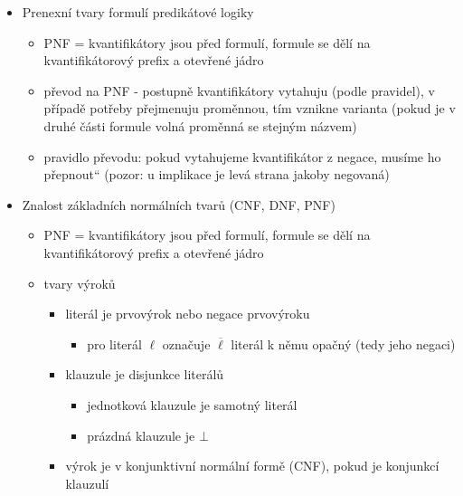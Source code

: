 \begin{itemize}
\begin{itemize}
\begin{itemize}
\item term $t$ je substituovatelný za proměnnou $x$ ve formuli $\varphi$, pokud po simultánním nahrazení všech volných výskytů $x$ ve $\varphi$ za $t$ nevznikne ve $\varphi$ žádný vázaný výskyt proměnné z $t$
\begin{itemize}
\item v tom případě říkáme vzniklé formuli instance $\varphi$ vzniklá substitucí $t$ za $x$ a označujeme ji $\varphi(x/t)$
\end{itemize}
\end{itemize}
\end{itemize}
\item Prenexní tvary formulí predikátové logiky
\begin{itemize}
\item PNF = kvantifikátory jsou před formulí, formule se dělí na kvantifikátorový prefix a otevřené jádro
\item převod na PNF - postupně kvantifikátory vytahuju (podle pravidel), v případě potřeby přejmenuju proměnnou, tím vznikne varianta (pokud je v druhé části formule volná proměnná se stejným názvem)
\item pravidlo převodu: pokud vytahujeme kvantifikátor z negace, musíme ho \quotedblbase{}přepnout\textquotedblleft{} (pozor: u implikace je levá strana jakoby negovaná)
\end{itemize}
\item Znalost základních normálních tvarů (CNF, DNF, PNF)
\begin{itemize}
\item PNF = kvantifikátory jsou před formulí, formule se dělí na kvantifikátorový prefix a otevřené jádro
\item tvary výroků
\begin{itemize}
\item literál je prvovýrok nebo negace prvovýroku
\begin{itemize}
\item pro literál $\ell$ označuje $\overline\ell$ literál k němu opačný (tedy jeho negaci)
\end{itemize}
\item klauzule je disjunkce literálů
\begin{itemize}
\item jednotková klauzule je samotný literál
\item prázdná klauzule je $\bot$
\end{itemize}
\item výrok je v konjunktivní normální formě (CNF), pokud je konjunkcí klauzulí

\end{itemize}
\end{itemize}
\end{itemize}
